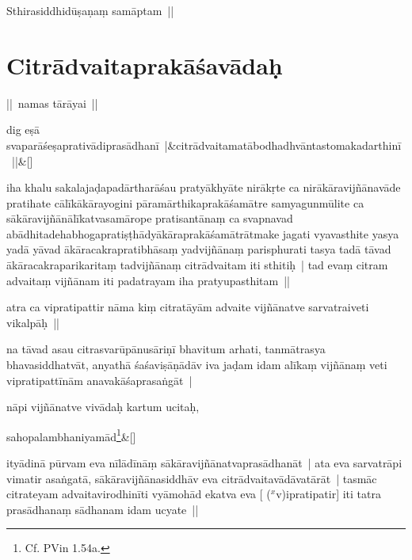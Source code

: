 \documentclass[article,12pt,a4paper]{memoir}
\newcommand{\corr}[1]{($^{x}$#1)}
\begin{document}
	  \pstart Sthirasiddhidūṣaṇaṃ samāptam || 
	\pend
      
	  
	
\section[{Citrādvaitaprakāśavādaḥ}]{Citrādvaitaprakāśavādaḥ}\label{Citrādvaitaprakāśavādaḥ}

	  \pstart || namas tārāyai || 
	\pend
      
	    
	    \stanza[\smallbreak]
	dig eṣā svaparāśeṣaprativādiprasādhanī |&citrādvaitamatābodhadhvāntastomakadarthinī ||\&[\smallbreak]


	

	  \pstart iha khalu sakalajaḍapadārtharāśau pratyākhyāte nirākṛte ca nirākāravijñānavāde pratihate cālīkākārayogini pāramārthikaprakāśamātre samyagunmūlite ca sākāravijñānālīkatvasamārope pratisantānaṃ ca svapnavad abādhitadehabhogapratiṣṭhādyākāraprakāśamātrātmake jagati vyavasthite yasya yadā yāvad ākāracakrapratibhāsaṃ yadvijñānaṃ parisphurati tasya tadā tāvad ākāracakraparikaritaṃ tadvijñānaṃ citrādvaitam iti sthitiḥ | tad evaṃ citram advaitaṃ vijñānam iti padatrayam iha pratyupasthitam || 
	\pend
      

	  \pstart atra ca vipratipattir nāma kiṃ citratāyām advaite vijñānatve sarvatraiveti vikalpāḥ || 
	\pend
      

	  \pstart na tāvad asau citrasvarūpānusāriṇī bhavitum arhati, tanmātrasya bhavasiddhatvāt, anyathā śaśaviṣāṇādāv iva jaḍam idam alīkaṃ vijñānaṃ veti vipratipattīnām anavakāśaprasaṅgāt |
	\pend
      

	  \pstart nāpi vijñānatve vivādaḥ kartum ucitaḥ,
	\pend
      
	    
	    \stanza[\smallbreak]
	sahopalambhaniyamād\footnote{Cf. PVin 1.54a.}\&[\smallbreak]


	

	  \pstart ityādinā pūrvam eva nīlādīnāṃ sākāravijñānatvaprasādhanāt | ata eva sarvatrāpi vimatir asaṅgatā, sākāravijñānasiddhāv eva citrādvaitavādāvatārāt | tasmāc citrateyam advaitavirodhinīti vyāmohād ekatva eva [ {\corr vipratipatir}] iti tatra prasādhanaṃ sādhanam idam ucyate ||
	\pend
      
\end{document}
